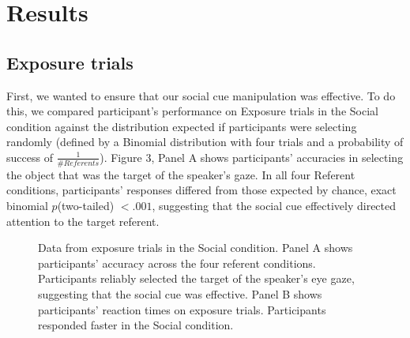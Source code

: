 \documentclass[man]{apa2}
\begin{document}

\section{Results}

\subsection{Exposure trials}

First, we wanted to ensure that our social cue manipulation was effective. To do this, we compared participant's performance on Exposure trials in the Social condition against the distribution expected if participants were selecting randomly (defined by a Binomial distribution with four trials and a probability of success of $\frac{1}{\# Referents}$). Figure 3, Panel A shows participants' accuracies in selecting the object that was the target of the speaker's gaze. In all four Referent conditions, participants' responses differed from those expected by chance, exact binomial  $p$(two-tailed) $< .001$, suggesting that the social cue effectively directed attention to the target referent.

%
\begin{figure}[H]
	\centering
	\caption{Data from exposure trials in the Social condition. Panel A shows participants' accuracy across the four referent conditions. Participants reliably selected the target of the speaker's eye gaze, suggesting that the social cue was effective. Panel B shows participants' reaction times on exposure trials. Participants responded faster in the Social condition.}
\end{figure}
%
\end{document}
